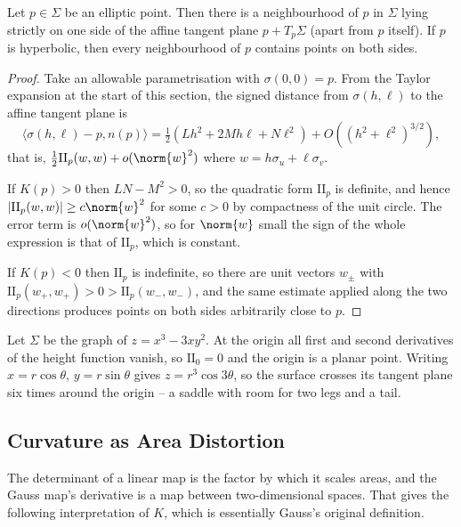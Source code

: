 \begin{proposition}
    Let $p \in \Sigma$ be an elliptic point. Then there is a neighbourhood of $p$ in $\Sigma$ lying strictly on one side of the affine tangent plane $p + T_p\Sigma$ (apart from $p$ itself). If $p$ is hyperbolic, then every neighbourhood of $p$ contains points on both sides.
\end{proposition}
\begin{proof}
    Take an allowable parametrisation with $\sigma(0,0) = p$. From the Taylor expansion at the start of this section, the signed distance from $\sigma(h, \ell)$ to the affine tangent plane is
    $$
    \langle \sigma(h,\ell) - p, n(p)\rangle = \tfrac{1}{2}\left(Lh^2 + 2Mh\ell + N\ell^2\right) + O\left((h^2+\ell^2)^{3/2}\right),
    $$
    that is, $\tfrac12 \mathrm{II}_p(w,w) + o(\norm{w}^2)$ where $w = h\sigma_u + \ell\sigma_v$.

    If $K(p) > 0$ then $LN - M^2 > 0$, so the quadratic form $\mathrm{II}_p$ is definite, and hence $|\mathrm{II}_p(w,w)| \geq c\norm{w}^2$ for some $c > 0$ by compactness of the unit circle. The error term is $o(\norm{w}^2)$, so for $\norm{w}$ small the sign of the whole expression is that of $\mathrm{II}_p$, which is constant.

    If $K(p) < 0$ then $\mathrm{II}_p$ is indefinite, so there are unit vectors $w_\pm$ with $\mathrm{II}_p(w_+, w_+) > 0 > \mathrm{II}_p(w_-,w_-)$, and the same estimate applied along the two directions produces points on both sides arbitrarily close to $p$.
\end{proof}

\begin{example}
    Let $\Sigma$ be the graph of $z = x^3 - 3xy^2$. At the origin all first and second derivatives of the height function vanish, so $\mathrm{II}_0 = 0$ and the origin is a planar point. Writing $x = r\cos\theta$, $y = r\sin\theta$ gives $z = r^3\cos 3\theta$, so the surface crosses its tangent plane six times around the origin -- a saddle with room for two legs and a tail.
\end{example}

\subsection{Curvature as Area Distortion}

The determinant of a linear map is the factor by which it scales areas, and the Gauss map's derivative is a map between two-dimensional spaces. That gives the following interpretation of $K$, which is essentially Gauss's original definition.

